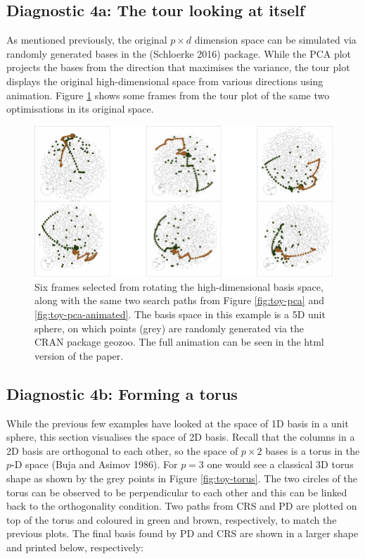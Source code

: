 \hypertarget{diagnostic-4a-the-tour-looking-at-itself}{%
\subsection{Diagnostic 4a: The tour looking at itself}\label{diagnostic-4a-the-tour-looking-at-itself}}

As mentioned previously, the original \(p \times d\) dimension space can be simulated via randomly generated bases in the  (Schloerke 2016) package. While the PCA plot projects the bases from the direction that maximises the variance, the tour plot displays the original high-dimensional space from various directions using animation. Figure \ref{fig:toy-tour} shows some frames from the tour plot of the same two optimisations in its original space.

\begin{figure}

{\centering \includegraphics[width=1\linewidth]{figs/toy-tour-1} 

}

\caption{Six frames selected from rotating the high-dimensional basis space, along with the same two search paths from Figure \ref{fig:toy-pca} and \ref{fig:toy-pca-animated}. The basis space in this example is a 5D unit sphere, on which points (grey) are randomly generated via the CRAN package geozoo. The full animation can be seen in the html version of the paper.}\label{fig:toy-tour}
\end{figure}

\hypertarget{diagnostic-4b-forming-a-torus}{%
\subsection{Diagnostic 4b: Forming a torus}\label{diagnostic-4b-forming-a-torus}}

While the previous few examples have looked at the space of 1D basis in a unit sphere, this section visualises the space of 2D basis. Recall that the columns in a 2D basis are orthogonal to each other, so the space of \(p \times 2\) bases is a torus in the \(p\)-D space (Buja and Asimov 1986). For \(p = 3\) one would see a classical 3D torus shape as shown by the grey points in Figure \ref{fig:toy-torus}. The two circles of the torus can be observed to be perpendicular to each other and this can be linked back to the orthogonality condition. Two paths from CRS and PD are plotted on top of the torus and coloured in green and brown, respectively, to match the previous plots. The final basis found by PD and CRS are shown in a larger shape and printed below, respectively:

